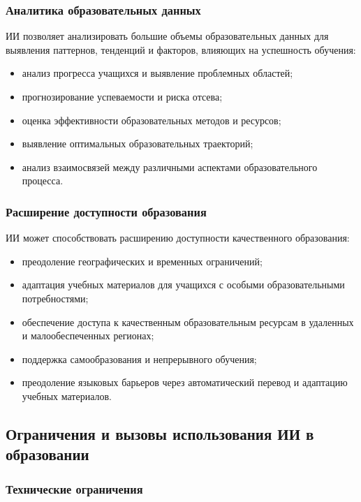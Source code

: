 \documentclass[a4paper,14pt]{extreport}
\begin{document}
\subsubsection{Аналитика образовательных данных}

ИИ позволяет анализировать большие объемы образовательных данных для выявления паттернов, тенденций и факторов, влияющих на успешность обучения:
\begin{itemize}
    \item анализ прогресса учащихся и выявление проблемных областей;
    \item прогнозирование успеваемости и риска отсева;
    \item оценка эффективности образовательных методов и ресурсов;
    \item выявление оптимальных образовательных траекторий;
    \item анализ взаимосвязей между различными аспектами образовательного процесса.
\end{itemize}

\subsubsection{Расширение доступности образования}

ИИ может способствовать расширению доступности качественного образования:
\begin{itemize}
    \item преодоление географических и временных ограничений;
    \item адаптация учебных материалов для учащихся с особыми образовательными потребностями;
    \item обеспечение доступа к качественным образовательным ресурсам в удаленных и малообеспеченных регионах;
    \item поддержка самообразования и непрерывного обучения;
    \item преодоление языковых барьеров через автоматический перевод и адаптацию учебных материалов.
\end{itemize}

\subsection{Ограничения и вызовы использования ИИ в образовании}

\subsubsection{Технические ограничения}
\end{document}
